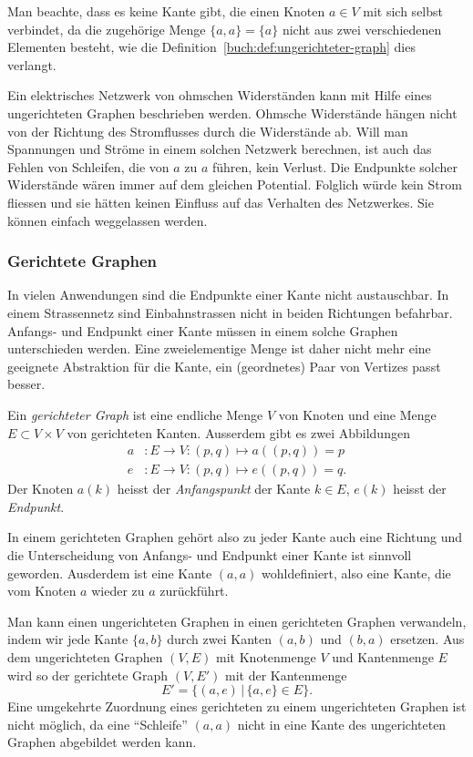 Man beachte, dass es keine Kante gibt, die einen Knoten $a\in V$
mit sich selbst verbindet, da die zugehörige Menge $\{a,a\}=\{a\}$
nicht aus zwei verschiedenen Elementen besteht, wie die
Definition~\ref{buch:def:ungerichteter-graph} dies verlangt.

Ein elektrisches Netzwerk von ohmschen Widerständen kann mit Hilfe
eines ungerichteten Graphen beschrieben werden.
Ohmsche Widerstände hängen nicht von der Richtung des Stromflusses
durch die Widerstände ab.
Will man Spannungen und Ströme in einem solchen Netzwerk berechnen,
ist auch das Fehlen von Schleifen, die von $a$ zu $a$ führen, kein
Verlust.
Die Endpunkte solcher Widerstände wären immer auf dem gleichen Potential.
Folglich würde kein Strom fliessen und sie hätten keinen Einfluss auf
das Verhalten des Netzwerkes.
Sie können einfach weggelassen werden.

\subsubsection{Gerichtete Graphen}
In vielen Anwendungen sind die Endpunkte einer Kante nicht austauschbar.
In einem Strassennetz sind Einbahnstrassen nicht in beiden Richtungen
befahrbar.
Anfangs- und Endpunkt einer Kante müssen in einem solche Graphen
unterschieden werden.
Eine zweielementige Menge ist daher nicht mehr eine geeignete Abstraktion
für die Kante, ein (geordnetes) Paar von Vertizes passt besser.

\begin{definition}
\label{buch:def:gerichteter-graph}
%
%
Ein {\em gerichteter Graph} ist eine endliche Menge $V$ von Knoten
und eine Menge $E \subset V\times V$ von gerichteten Kanten.
Ausserdem gibt es zwei Abbildungen
\[
\begin{aligned}
a&\colon E\to V: (p,q) \mapsto a((p,q)) = p
\\
e&\colon E\to V: (p,q) \mapsto e((p,q)) = q.
\end{aligned}
\]
Der Knoten $a(k)$ heisst der {\em Anfangspunkt} der Kante $k\in E$,
$e(k)$ heisst der {\em Endpunkt}.
\end{definition}

In einem gerichteten Graphen gehört also zu jeder Kante auch eine Richtung
und die Unterscheidung von Anfangs- und Endpunkt einer Kante ist sinnvoll
geworden.
Ausderdem ist eine Kante $(a,a)$ wohldefiniert, also eine Kante, die vom
Knoten $a$ wieder zu $a$ zurückführt.

Man kann einen ungerichteten Graphen in einen gerichteten Graphen
verwandeln, indem wir jede Kante $\{a,b\}$ durch zwei Kanten 
$(a,b)$ und $(b,a)$ ersetzen.
Aus dem ungerichteten Graphen $(V,E)$ mit Knotenmenge $V$ und Kantenmenge
$E$ wird so der gerichtete Graph
$(V,E')$ mit der Kantenmenge
\begin{equation*}
E' 
=
\{
(a,e)
\,|\,
\{a,e\}\in E
\}.
\end{equation*}
Eine umgekehrte Zuordnung eines gerichteten zu einem ungerichteten
Graphen ist nicht möglich, da eine ``Schleife'' $(a,a)$ nicht in eine Kante
des ungerichteten Graphen abgebildet werden kann.

